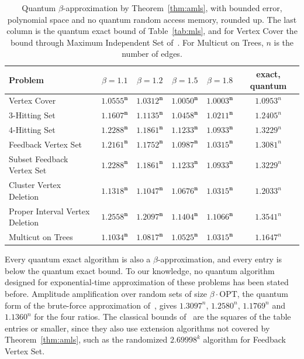 \documentclass[11pt]{article}
\theoremstyle{remark}
\begin{document}
\begin{table}[h]
\centering\small
\begin{tabular}{lccccc}
\toprule
Problem & $\beta = 1.1$ & $\beta = 1.2$ & $\beta = 1.5$ & $\beta = 1.8$ & exact, quantum\\
\midrule
Vertex Cover & $\mathbf{1.0555^n}$ & $\mathbf{1.0312^n}$ & $\mathbf{1.0050^n}$ & $\mathbf{1.0003^n}$ & $1.0953^n$\\
3-Hitting Set & $\mathbf{1.1607^n}$ & $\mathbf{1.1135^n}$ & $\mathbf{1.0458^n}$ & $\mathbf{1.0211^n}$ & $1.2405^n$\\
4-Hitting Set & $\mathbf{1.2288^n}$ & $\mathbf{1.1861^n}$ & $\mathbf{1.1233^n}$ & $\mathbf{1.0933^n}$ & $1.3229^n$\\
Feedback Vertex Set & $\mathbf{1.2161^n}$ & $\mathbf{1.1752^n}$ & $\mathbf{1.0987^n}$ & $\mathbf{1.0315^n}$ & $1.3081^n$\\
Subset Feedback Vertex Set & $\mathbf{1.2288^n}$ & $\mathbf{1.1861^n}$ & $\mathbf{1.1233^n}$ & $\mathbf{1.0933^n}$ & $1.3229^n$\\
Cluster Vertex Deletion & $\mathbf{1.1318^n}$ & $\mathbf{1.1047^n}$ & $\mathbf{1.0676^n}$ & $\mathbf{1.0315^n}$ & $1.2033^n$\\
Proper Interval Vertex Deletion & $\mathbf{1.2558^n}$ & $\mathbf{1.2097^n}$ & $\mathbf{1.1404^n}$ & $\mathbf{1.1066^n}$ & $1.3541^n$\\
Multicut on Trees & $\mathbf{1.1034^n}$ & $\mathbf{1.0817^n}$ & $\mathbf{1.0525^n}$ & $\mathbf{1.0315^n}$ & $1.1647^n$\\
\bottomrule
\end{tabular}
\caption{Quantum $\beta$-approximation by Theorem~\ref{thm:amls}, with bounded error, polynomial space and no quantum random access memory, rounded up. The last column is the quantum exact bound of Table~\ref{tab:mls}, and for Vertex Cover the bound through Maximum Independent Set of~\cite{SengeVC}. For Multicut on Trees, $n$ is the number of edges.}
\label{tab:amls}
\end{table}

Every quantum exact algorithm is also a $\beta$-approximation, and every entry is below the quantum exact bound. To our knowledge, no quantum algorithm designed for exponential-time approximation of these problems has been stated before. Amplitude amplification over random sets of size $\beta \cdot \mathrm{OPT}$, the quantum form of the brute-force approximation of~\cite{EKMNS22}, gives $1.3097^n$, $1.2580^n$, $1.1769^n$ and $1.1360^n$ for the four ratios. The classical bounds of~\cite{EKMNS22,EKMNS24} are the squares of the table entries or smaller, since they also use extension algorithms not covered by Theorem~\ref{thm:amls}, such as the randomized $2.69998^k$ algorithm for Feedback Vertex Set.
\end{document}
